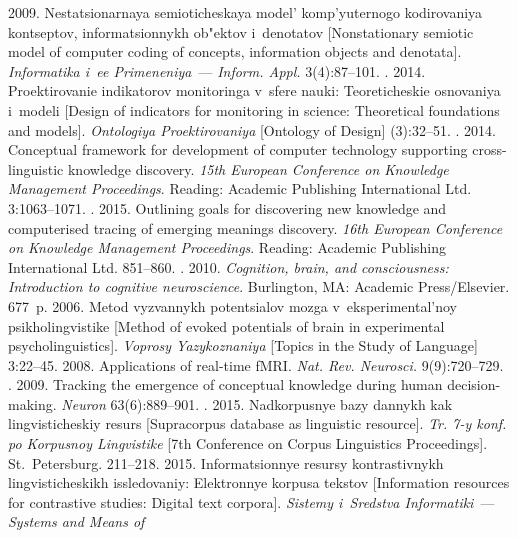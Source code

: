 {\begin{multicols}{2}
{{\begin{thebibliography}{99}
 2009. Nestatsionarnaya semioticheskaya model' komp'yuternogo 
kodirovaniya kontseptov, informatsionnykh ob"ektov i~denotatov [Nonstationary semiotic 
model of computer coding of concepts, information objects and denotata]. \textit{Informatika 
i~ee Primeneniya}~--- \textit{Inform. Appl.} 3(4):87--101.
. 2014. Proektirovanie indikatorov monitoringa v~sfere 
nauki: Teoreticheskie osnovaniya i~modeli [Design of indicators for monitoring in science: 
Theoretical foundations and models]. \textit{Ontologiya Proektirovaniya} [Ontology of 
Design] (3):32--51.
. 2014. 
Conceptual framework for development of computer technology supporting cross-linguistic 
knowledge discovery. \textit{15th European Conference on Knowledge Management 
Proceedings}. Reading: Academic Publishing International Ltd. 3:1063--1071.
. 2015. Outlining goals for discovering new knowledge 
and computerised tracing of emerging meanings discovery. \textit{16th European Conference 
on Knowledge Management Proceedings}. Reading: Academic Publishing International 
Ltd. 851--860.
. 2010. \textit{Cognition, brain, and consciousness: Introduction 
to cognitive neuroscience}. Burlington, MA: Academic Press/Elsevier. 677~p.
 2006. Metod vyzvannykh potentsialov mozga v~eksperimental'noy 
psikholingvistike [Method of evoked potentials of brain in experimental psycholinguistics]. 
\textit{Voprosy Yazykoznaniya} [Topics in the Study of Language] 3:22--45.
 2008. Applications of real-time fMRI. \textit{Nat. Rev. 
Neurosci.} 9(9):720--729.
. 2009. Tracking the 
emergence of conceptual knowledge during human decision-making. \textit{Neuron} 
63(6):889--901.
. 2015. Nadkorpusnye 
bazy dannykh kak lingvisticheskiy resurs [Supracorpus database as linguistic resource]. 
\textit{Tr. 7-y konf. po Korpusnoy Lingvistike} [7th Conference on Corpus Linguistics 
Proceedings]. St.\ Petersburg. 211--218.
 2015. Informatsionnye resursy kontrastivnykh lingvisticheskikh 
issledovaniy: Elektronnye korpusa tekstov [Information resources for contrastive studies: 
Digital text corpora]. \textit{Sistemy i~Sredstva Informatiki}~--- \textit{Systems and Means of 
}
\end{thebibliography}}}
\end{multicols}}

